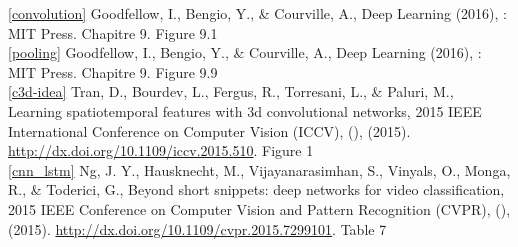 \documentclass[11pt]{article}
\begin{document}
\ref{convolution} Goodfellow, I., Bengio, Y., \& Courville, A., Deep Learning (2016), : MIT Press. Chapitre 9. Figure 9.1\\

\ref{pooling} Goodfellow, I., Bengio, Y., \& Courville, A., Deep Learning (2016), : MIT Press. Chapitre 9. Figure 9.9\\

\ref{c3d-idea} Tran, D., Bourdev, L., Fergus, R., Torresani, L., \& Paluri, M., Learning spatiotemporal features with 3d convolutional networks, 2015 IEEE International Conference on Computer Vision (ICCV), (),  (2015).  \url{http://dx.doi.org/10.1109/iccv.2015.510}. Figure 1\\

\ref{cnn_lstm} Ng, J. Y., Hausknecht, M., Vijayanarasimhan, S., Vinyals, O., Monga, R., \& Toderici, G., Beyond short snippets: deep networks for video classification, 2015 IEEE Conference on Computer Vision and Pattern Recognition (CVPR), (),  (2015).  \url{http://dx.doi.org/10.1109/cvpr.2015.7299101}. Table 7\\


\end{document}
